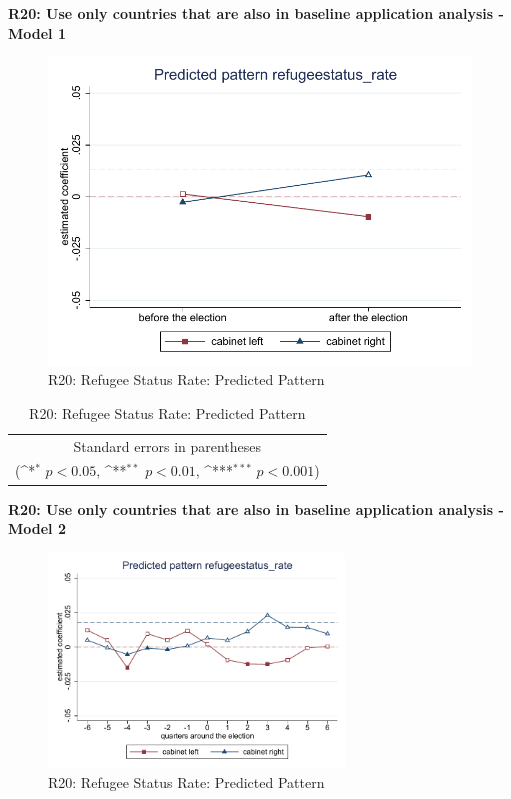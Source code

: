 \documentclass[10pt,a4paper]{scrartcl}
\begin{document}
\clearpage
\textbf{R20: Use only countries that are also in baseline application analysis - Model 1}
\begin{figure}[!ht]
	\centering
	\includegraphics[width=1\textwidth]{figures_edited/refugeestatus_rate_graph1_R20.pdf}
	\caption{R20: Refugee Status Rate: Predicted Pattern}
\end{figure}

\begin{table}[!ht]\centering
	\renewcommand{\arraystretch}{1.25}
	\def\sym#1{\ifmmode^{#1}\else\(^{#1}\)\fi}
	\caption{R20: Refugee Status Rate: Predicted Pattern}
	\begin{tabular}{l*{2}{c}}
		\hline\hline
		
		\hline\hline
		\multicolumn{3}{c}{\footnotesize Standard errors in parentheses} \\
		\multicolumn{3}{c}{\footnotesize (\sym{*} \(p<0.05\), \sym{**} \(p<0.01\), \sym{***} \(p<0.001\))}\\
	\end{tabular}
\end{table}

\clearpage
\textbf{R20: Use only countries that are also in baseline application analysis - Model 2}
\begin{figure}[!ht]
	\centering
	\includegraphics[width=0.7\textwidth]{figures_edited/refugeestatus_rate_graph2_R20.pdf}
	\caption{R20: Refugee Status Rate: Predicted Pattern}
\end{figure}
\end{document}
